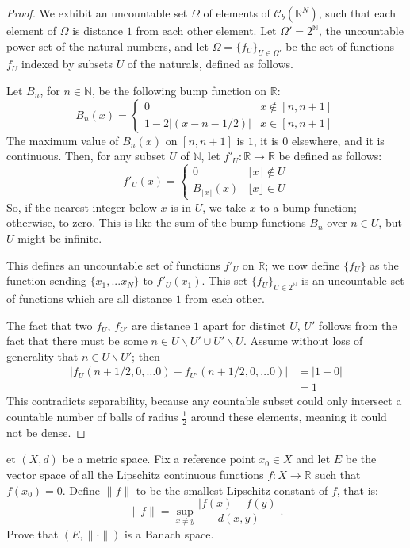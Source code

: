 \documentclass[12pt]{article}
\newcommand{\N}{\mathbb{N}}
\newcommand{\R}{\mathbb{R}}
\newcommand{\bs}{\backslash}
\theoremstyle{definition}
\newenvironment{problem}[2][Problem]{\begin{trivlist}
\item[\hskip \labelsep {\bfseries #1}\hskip \labelsep {\bfseries #2.}]}{\end{trivlist}}
\begin{document}
\begin{proof}
    We exhibit an uncountable set $\Omega$ of elements of $\mathcal{C}_b(\R^N)$, such that each element of $\Omega$ is distance $1$ from each other element. Let $\Omega' = 2^\N$, the uncountable power set of the natural numbers, and let $\Omega = \{f_U\}_{U \in \Omega'}$ be the set of functions $f_U$ indexed by subsets $U$ of the naturals, defined as follows.
    \par Let $B_n$, for $n \in \N$, be the following bump function on $\R$:
    \[
    B_n(x) = \begin{cases}
    0 & x \notin [n, n+1]\\
    1 - 2\lvert (x-n - 1/2) \rvert & x \in [n, n+1]
    \end{cases}
    \]
    The maximum value of $B_n(x)$ on $[n,n+1]$ is $1$, it is $0$ elsewhere, and it is continuous. Then, for any subset $U$ of $\N$, let $f'_U : \R \to \R$ be defined as follows:
    \[
    f'_U(x) = \begin{cases}
    0 & \lfloor x \rfloor \notin U\\
    B_{\lfloor x \rfloor}(x) & \lfloor x \rfloor \in U
    \end{cases}
    \]
    So, if the nearest integer below $x$ is in $U$, we take $x$ to a bump function; otherwise, to zero. This is like the sum of the bump functions $B_n$ over $n \in U$, but $U$ might be infinite.
    \par This defines an uncountable set of functions $f'_U$ on $\R$; we now define $\{f_U\}$ as the function sending $\{x_1, ... x_N\}$ to $f'_U(x_1)$. This set $\{f_U\}_{U \in 2^\N}$ is an uncountable set of functions which are all distance $1$ from each other.
    \par The fact that two $f_U$, $f_{U'}$ are distance $1$ apart for distinct $U$, $U'$ follows from the fact that there must be some $n \in U \bs U' \cup U' \bs U$. Assume without loss of generality that $n \in U \bs U'$; then 
    \begin{align*}
        \lvert f_U(n+1/2, 0, \dots 0) - f_{U'}(n+1/2, 0, \dots 0) \rvert &= \lvert 1 - 0 \rvert\\
        &= 1
    \end{align*}
    This contradicts separability, because any countable  subset could only intersect a countable number of balls of radius $\frac{1}{2}$ around these elements, meaning it could not be dense.
\end{proof}
\begin{problem}
Let $(X,d)$ be a metric space. Fix a reference point $x_0 \in X$ and let $E$ be the vector space of all the Lipschitz continuous functions $f : X \to \R$ such that $f(x_0) = 0$. Define $\lVert f \rVert$ to be the smallest Lipschitz constant of $f$, that is:
\[
\lVert f \rVert = \sup_{x \neq y} \frac{\lvert f(x) - f(y) \rvert}{d(x,y)}.
\]
Prove that $(E,\lVert \cdot \rVert)$ is a Banach space.
\end{problem}
\end{document}
